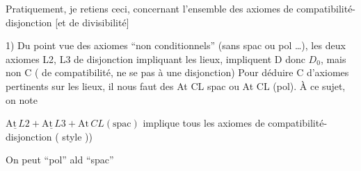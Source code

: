 Pratiquement, je retiens ceci, concernant l'ensemble des axiomes de compatibilité-disjonction [et de divisibilité]

1) Du point  vue des axiomes ``non conditionnels'' (sans  spac ou pol \ldots), les deux axiomes L2, L3 de disjonction impliquant les lieux, impliquent D donc $D_0$, mais non C ( de compatibilité, ne se  pas à une disjonction) Pour déduire C d'axiomes pertinents sur les lieux, il nous faut des At CL spac ou At CL (pol). À ce sujet, on note

$\underline{\mathrm{At}\,L}2+\underline{\mathrm{At}\,L}3+\mathrm{At}\,CL(\mathrm{spac})$ implique tous les axiomes de compatibilité-disjonction ( style )) 

On peut   ``pol'' ald ``spac''
